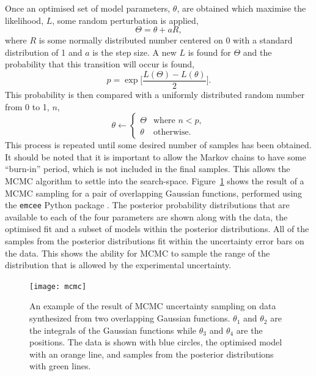 \documentclass[
 reprint,
 superscriptaddress,
 amsmath,amssymb,
 aps,
]{revtex4-1}
\begin{document}
Once an optimised set of model parameters, $\theta$, are obtained which maximise the likelihood, $L$, some random perturbation is applied,
%
\begin{equation}
    \Theta = \theta + aR,
\end{equation}
%
where $R$ is some normally distributed number centered on \num{0} with a standard distribution of \num{1} and $a$ is the step size.
A new $L$ is found for $\Theta$ and the probability that this transition will occur is found,
%
\begin{equation}
    p = \exp{\bigg[\frac{L(\Theta) - L(\theta)}{2}\bigg]}.
\end{equation}
%
This probability is then compared with a uniformly distributed random number from \num{0} to \num{1}, $n$,
%
\begin{equation}
    \theta \leftarrow
    \begin{cases}
        \Theta & \text{where } n < p,\\
        \theta & \text{otherwise}.
    \end{cases}
\end{equation}
%
This process is repeated until some desired number of samples has been obtained.
It should be noted that it is important to allow the Markov chains to have some ``burn-in'' period, which is not included in the final samples.
This allows the MCMC algorithm to settle into the search-space.
Figure~\ref{fig:mcmc} shows the result of a MCMC sampling for a pair of overlapping Gaussian functions, performed using the \texttt{emcee} Python package \cite{foremanmackey_emcee_2012}.
The posterior probability distributions that are available to each of the four parameters are shown along with the data, the optimised fit and a subset of models within the posterior distributions.
All of the samples from the posterior distributions fit within the uncertainty error bars on the data.
This shows the ability for MCMC to sample the range of the distribution that is allowed by the experimental uncertainty.
%
\begin{figure}[t]
    \texttt{[image: mcmc]}
    \caption{An example of the result of MCMC uncertainty sampling on data synthesized from two overlapping Gaussian functions. $\theta_1$ and $\theta_2$ are the integrals of the Gaussian functions while $\theta_3$ and $\theta_4$ are the positions. The data is shown with blue circles, the optimised model with an orange line, and samples from the posterior distributions with green lines.}
    \label{fig:mcmc}
\end{figure}
%
\end{document}
